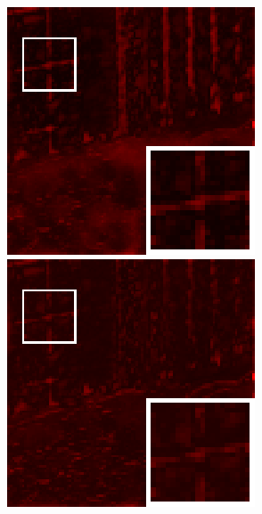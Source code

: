 \begin{figure}[t]
\begin{center}
\begin{minipage}{0.15\hsize}
		\end{minipage}
		\begin{minipage}{0.15\hsize}
			\centerline{\includegraphics[width=\hsize]{./fig_supplement/SAM_map_color_woboundary/Beltsville/sam_map_STV.eps}} %
		\end{minipage}
		\begin{minipage}{0.15\hsize}
			\centerline{\includegraphics[width=\hsize]{./fig_supplement/SAM_map_color_woboundary/Beltsville/sam_map_SSST.eps}} %

\end{minipage}
\end{center}
\end{figure}
